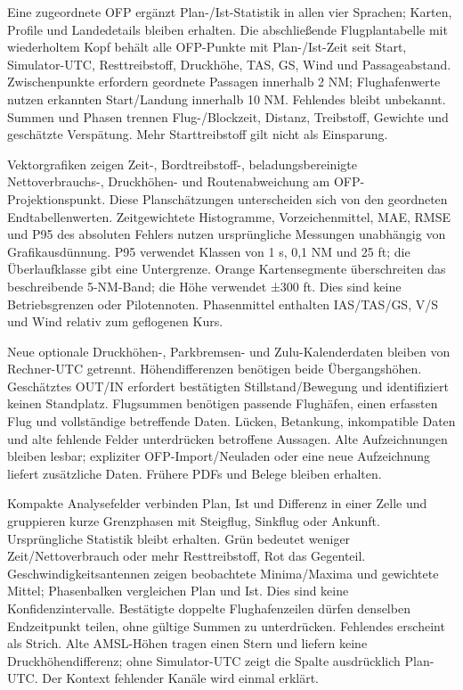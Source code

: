 \documentclass[11pt,a4paper]{article}
\begin{document}
Eine zugeordnete OFP ergänzt Plan-/Ist-Statistik in allen vier Sprachen;
Karten, Profile und Landedetails bleiben erhalten. Die abschließende
Flugplantabelle mit wiederholtem Kopf behält alle OFP-Punkte mit Plan-/Ist-Zeit
seit Start, Simulator-UTC, Resttreibstoff, Druckhöhe, TAS, GS, Wind und
Passageabstand. Zwischenpunkte erfordern geordnete Passagen innerhalb 2 NM;
Flughafenwerte nutzen erkannten Start/Landung innerhalb 10 NM. Fehlendes bleibt
unbekannt. Summen und Phasen trennen Flug-/Blockzeit, Distanz, Treibstoff,
Gewichte und geschätzte Verspätung. Mehr Starttreibstoff gilt nicht als
Einsparung.

Vektorgrafiken zeigen Zeit-, Bordtreibstoff-, beladungsbereinigte
Nettoverbrauchs-, Druckhöhen- und Routenabweichung am OFP-Projektionspunkt.
Diese Planschätzungen unterscheiden sich von den geordneten Endtabellenwerten.
Zeitgewichtete Histogramme, Vorzeichenmittel, MAE, RMSE und P95 des absoluten
Fehlers nutzen ursprüngliche Messungen unabhängig von Grafikausdünnung.
P95 verwendet Klassen von 1 s, 0,1 NM und 25 ft; die Überlaufklasse gibt eine
Untergrenze. Orange Kartensegmente überschreiten das beschreibende 5-NM-Band;
die Höhe verwendet ±300 ft. Dies sind keine Betriebsgrenzen oder Pilotennoten.
Phasenmittel enthalten IAS/TAS/GS, V/S und Wind relativ zum geflogenen Kurs.

Neue optionale Druckhöhen-, Parkbremsen- und Zulu-Kalenderdaten bleiben von
Rechner-UTC getrennt. Höhendifferenzen benötigen beide Übergangshöhen.
Geschätztes OUT/IN erfordert bestätigten Stillstand/Bewegung und identifiziert
keinen Standplatz. Flugsummen benötigen passende Flughäfen, einen erfassten
Flug und vollständige betreffende Daten. Lücken, Betankung, inkompatible Daten
und alte fehlende Felder unterdrücken betroffene Aussagen. Alte Aufzeichnungen
bleiben lesbar; expliziter OFP-Import/Neuladen oder eine neue Aufzeichnung
liefert zusätzliche Daten. Frühere PDFs und Belege bleiben erhalten.

Kompakte Analysefelder verbinden Plan, Ist und Differenz in einer Zelle und
gruppieren kurze Grenzphasen mit Steigflug, Sinkflug oder Ankunft. Ursprüngliche
Statistik bleibt erhalten. Grün bedeutet weniger Zeit/Nettoverbrauch oder mehr
Resttreibstoff, Rot das Gegenteil. Geschwindigkeitsantennen zeigen beobachtete
Minima/Maxima und gewichtete Mittel; Phasenbalken vergleichen Plan und Ist.
Dies sind keine Konfidenzintervalle. Bestätigte doppelte Flughafenzeilen dürfen
denselben Endzeitpunkt teilen, ohne gültige Summen zu unterdrücken. Fehlendes
erscheint als Strich. Alte AMSL-Höhen tragen einen Stern und liefern keine
Druckhöhendifferenz; ohne Simulator-UTC zeigt die Spalte ausdrücklich Plan-UTC.
Der Kontext fehlender Kanäle wird einmal erklärt.
\end{document}

